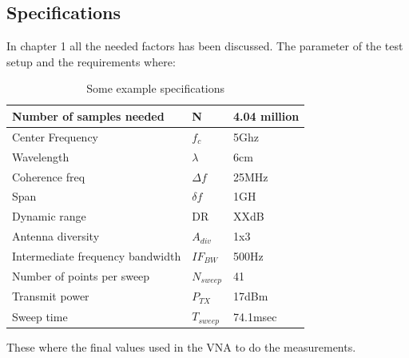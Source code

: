 \subsection{Specifications}
In chapter 1 all the needed factors has been discussed. The parameter of the test setup and the requirements where:
\begin{table}[H]
\centering
\caption{Some example specifications}
\label{final_specs}
\begin{tabular}{|l|l|l|}
\hline
Number of samples needed         & N           & 4.04 million         \\ \hline
Center Frequency                 & $f_c$       & 5Ghz             \\ \hline
Wavelength                       & $\lambda$   & 6cm           \\ \hline
Coherence freq                   & $\Delta f$  & 25MHz           \\ \hline
Span & $\delta f$ & 1GH \\ \hline
Dynamic range                    & DR          & XXdB            \\ \hline
Antenna diversity                & $A_{div}$   & 1x3                    \\ \hline
Intermediate frequency bandwidth & $IF_{BW}$     & 500Hz          \\ \hline
Number of points per sweep & $N_{sweep}$ & 41 \\ \hline
Transmit power & $P_{TX}$ & 17dBm \\ \hline
Sweep time & $T_{sweep}$ &74.1msec \\ \hline
\end{tabular}
\end{table}
These where the final values used in the VNA to do the measurements.
